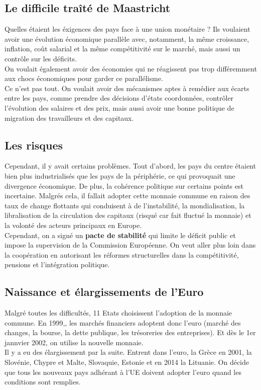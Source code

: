 \subsection{Le difficile traîté de Maastricht}
Quelles étaient les éxigences des pays face à une union monétaire ? Ils voulaient avoir une évolution économique parallèle avec, notamment, la même croissance, inflation, coût salarial et la même compétitivité sur le marché, mais aussi un contrôle sur les déficits.\\
On voulait également avoir des économies qui ne réagissent pas trop différemment aux chocs économiques pour garder ce parallélisme. \\
Ce n'est pas tout. On voulait avoir des mécanismes aptes à remédier aux écarts entre les pays, comme prendre des décisions d'états coordonnées, contrôler l'évolution des salaires et des prix, mais aussi avoir une bonne politique de migration des travailleurs et des capitaux. 

\subsection{Les risques}
Cependant, il y avait certains problèmes. Tout d'abord, les pays du centre étaient bien plus industrialisés que les pays de la périphérie, ce qui provoquait une divergence économique. De plus, la cohérence politique sur certains points est incertaine. Malgrés cela, il fallait adopter cette monnaie commune en raison des taux de change flottants qui conduisent à de l'instabilité, la mondialisation, la libralisation de la circulation des capitaux (risqué car fait fluctué la monnaie) et la volonté des acteurs principaux en Europe. \\
Cependant, on a signé un \textbf{pacte de stabilité} qui limite le déficit public et impose la supervision de la Commission Européenne. On veut aller plus loin dans la coopération en autorisant les réformes structurelles dans la compétitivité, pensions et l'intégration politique.

\subsection{Naissance et élargissements de l'Euro}
Malgré toutes les difficultés, 11 Etats choisissent l'adoption de la monnaie commune. En 1999,, les marchés financiers adoptent donc l'euro (marché des changes, la bourse, la dette publique, les trésoreries des entreprises). Et dès le 1er jannvier 2002, on utilise la nouvelle monnaie. \\
Il y a eu des élargissement par la suite. Entrent dans l'euro, la Grèce en 2001, la Slovénie, Chypre et Malte, Slovaquie, Estonie et en 2014 la Lituanie. On décide que tous les nouveaux pays adhérant à l'UE doivent adopter l'euro quand les conditions sont remplies. 

